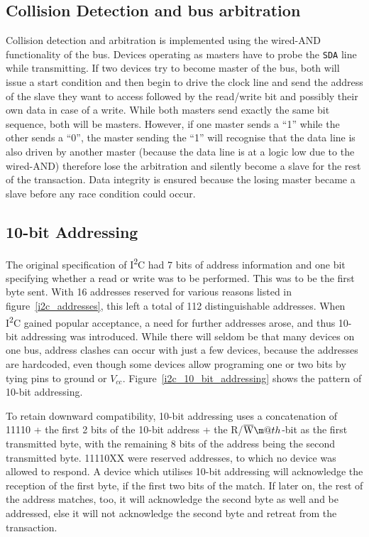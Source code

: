 \documentclass[journal]{IEEEtran}
\makeatletter
\newcommand{\twi}{I\textsuperscript{2}C\xspace}
\newcommand{\sda}{\texttt{SDA}\xspace}
\newcommand*{\textoverline}[1]{$\overline{\hbox{#1}}\m@th$}
\makeatother
\begin{document}
\subsection{Collision Detection and bus arbitration}
Collision detection and arbitration is implemented using the wired-AND functionality of the bus. Devices operating as masters have to probe the \sda line while transmitting. If two devices try to become master of the bus, both will issue a start condition and then begin to drive the clock line and send the address of the slave they want to access followed by the read/write bit and possibly their own data in case of a write. While both masters send exactly the same bit sequence, both will be masters. However, if one master sends a ``1'' while the other sends a ``0'', the master sending the ``1'' will recognise that the data line is also driven by another master (because the data line is at a logic low due to the wired-AND) therefore lose the arbitration and silently become a slave for the rest of the transaction. Data integrity is ensured because the losing master became a slave before any race condition could occur.

\subsection{10-bit Addressing}
The original specification of \twi had 7 bits of address information and one bit specifying whether a read or write was to be performed. This was to be the first byte sent. With 16 addresses reserved for various reasons listed in figure~\ref{i2c_addresses}, this left a total of 112 distinguishable addresses. When \twi gained popular acceptance, a need for further addresses arose, and thus 10-bit addressing was introduced. While there will seldom be that many devices on one bus, address clashes can occur with just a few devices, because the addresses are hardcoded, even though some devices allow programing one or two bits by tying pins to ground or $V_{cc}$. Figure~\ref{i2c_10_bit_addressing} shows the pattern of 10-bit addressing.

To retain downward compatibility, 10-bit addressing uses a concatenation of 11110 + the first 2 bits of the 10-bit address + the R/\textoverline{W}-bit as the first transmitted byte, with the remaining 8 bits of the address being the second transmitted byte. 11110XX were reserved addresses, to which no device was allowed to respond. A device which utilises 10-bit addressing will acknowledge the reception of the first byte, if the first two bits of the match. If later on, the rest of the address matches, too, it will acknowledge the second byte as well and be addressed, else it will not acknowledge the second byte and retreat from the transaction.
\end{document}

